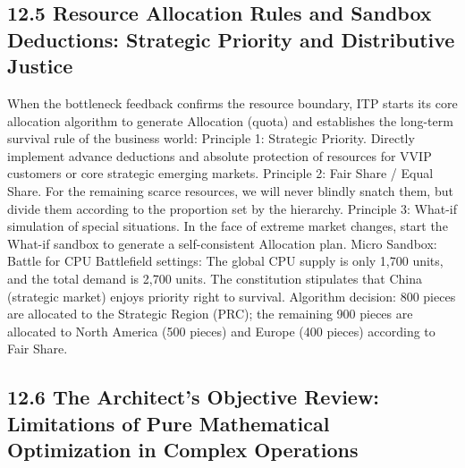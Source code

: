 \documentclass[11pt,a4paper]{article}
\begin{document}
\subsection*{12.5 Resource Allocation Rules and Sandbox Deductions: Strategic Priority and Distributive Justice}


When the bottleneck feedback confirms the resource boundary, ITP starts its core allocation algorithm to generate Allocation (quota) and establishes the long-term survival rule of the business world: Principle 1: Strategic Priority. Directly implement advance deductions and absolute protection of resources for VVIP customers or core strategic emerging markets. Principle 2: Fair Share / Equal Share. For the remaining scarce resources, we will never blindly snatch them, but divide them according to the proportion set by the hierarchy. Principle 3: What-if simulation of special situations. In the face of extreme market changes, start the What-if sandbox to generate a self-consistent Allocation plan. Micro Sandbox: Battle for CPU Battlefield settings: The global CPU supply is only 1,700 units, and the total demand is 2,700 units. The constitution stipulates that China (strategic market) enjoys priority right to survival. Algorithm decision: 800 pieces are allocated to the Strategic Region (PRC); the remaining 900 pieces are allocated to North America (500 pieces) and Europe (400 pieces) according to Fair Share.


\subsection*{12.6 The Architect’s Objective Review: Limitations of Pure Mathematical Optimization in Complex Operations}
\end{document}
